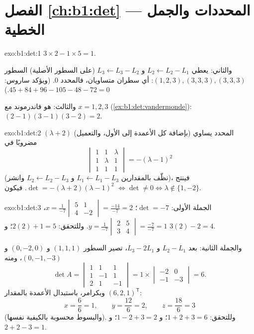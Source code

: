\section*{الفصل \ref{ch:b1:det} --- المحددات والجمل الخطية}

\begin{solution}{exo:b1:det:1}
$3 \times 2 - 1 \times 5 = 1$.

والثاني: يعطي $L_2 \leftarrow L_2 - L_1$ و $L_3 \leftarrow L_3 - L_2$ (على
السطور الأصلية) السطور $(1,2,3), (3,3,3), (3,3,3)$: أي سطران
متساويان، فالمحدد $0$. (ويؤكد ساروس: $45 + 84 + 96 - 105 - 48 -
72 = 0$.)

والثالث: هو فاندرموند مع $x = 1, 2, 3$
(\cref{ex:b1:det:vandermonde}): $(2-1)(3-1)(3-2) = 2$.
\end{solution}

\begin{solution}{exo:b1:det:2}
المحدد يساوي (بإضافة كل الأعمدة إلى الأول، والتعميل)
$(\lambda + 2)$ مضروبًا في
\[
\begin{vmatrix}
1 & 1 & \lambda\\ 1 & \lambda & 1\\ 1 & 1 & 1
\end{vmatrix}
= -(\lambda - 1)^2
\]
(نظّف بالمقدارين $L_1 \leftarrow L_1 - L_3$ و $L_2 \leftarrow L_2 - L_3$
وانشر)، فينتج $\det = -(\lambda+2)(\lambda-1)^2$. فيكون 
$\iff \det \neq 0 \iff \lambda \notin \{1, -2\}$.
\end{solution}

\begin{solution}{exo:b1:det:3}
الجملة الأولى: $\det = -7$؛
$x = \frac{1}{-7}\begin{vmatrix} 5 & 1\\ 4 & -2\end{vmatrix}
= \frac{-14}{-7} = 2$،
$y = \frac{1}{-7}\begin{vmatrix} 2 & 5\\ 3 & 4\end{vmatrix}
= \frac{-7}{-7} = 1$. وللتحقق: $2(2) + 1 = 5$؛ و $3(2) - 2 = 4$.

والجملة الثانية: بعد $L_2 - L_1$ و $L_3 - 2L_1$، تصير السطور
$(1,1,1)$ و $(0,-2,0)$ و $(0,-1,-3)$، ومنه
\[
\det A = \begin{vmatrix} 1&1&1\\ 1&-1&1\\ 2&1&-1\end{vmatrix}
= 1 \times \begin{vmatrix} -2 & 0\\ -1 & -3\end{vmatrix} = 6 .
\]
وبكرامر، باستبدال الأعمدة بالمقدار $(6,2,1)^{\mathsf T}$:
\[
x = \frac{6}{6} = 1, \qquad
y = \frac{12}{6} = 2, \qquad
z = \frac{18}{6} = 3
\]
(والبسوط محسوبة بالكيفية نفسها). وللتحقق: $1 + 2 + 3 = 6$؛ و $1 -
2 + 3 = 2$؛ و $2 + 2 - 3 = 1$.
\end{solution}

